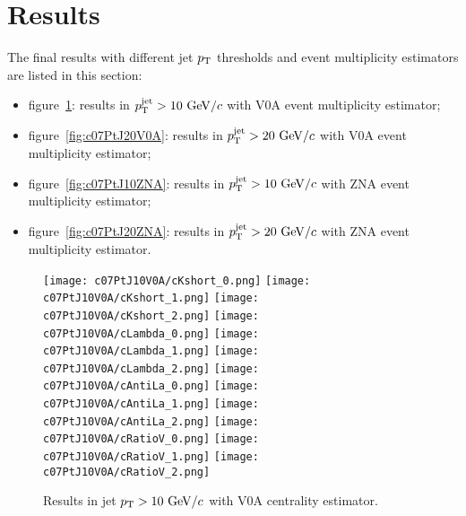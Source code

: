 \section{Results}

The final results with different jet $p_{\rm T}$ thresholds and event
multiplicity estimators are listed in this section:
\begin{itemize}
\item figure~\ref{fig:c07PtJ10V0A}:
      results in $p_{\rm T}^{\rm jet}>10~{\rm GeV}/c$
      with V0A event multiplicity estimator;
\item figure~\ref{fig:c07PtJ20V0A}:
      results in $p_{\rm T}^{\rm jet}>20~{\rm GeV}/c$
      with V0A event multiplicity estimator;
\item figure~\ref{fig:c07PtJ10ZNA}:
      results in $p_{\rm T}^{\rm jet}>10~{\rm GeV}/c$
      with ZNA event multiplicity estimator;
\item figure~\ref{fig:c07PtJ20ZNA}:
      results in $p_{\rm T}^{\rm jet}>20~{\rm GeV}/c$
      with ZNA event multiplicity estimator.
\end{itemize}

\begin{figure}[htb]
\begin{center}
\texttt{[image: c07PtJ10V0A/cKshort\_0.png]}
\texttt{[image: c07PtJ10V0A/cKshort\_1.png]}
\texttt{[image: c07PtJ10V0A/cKshort\_2.png]}
\texttt{[image: c07PtJ10V0A/cLambda\_0.png]}
\texttt{[image: c07PtJ10V0A/cLambda\_1.png]}
\texttt{[image: c07PtJ10V0A/cLambda\_2.png]}
\texttt{[image: c07PtJ10V0A/cAntiLa\_0.png]}
\texttt{[image: c07PtJ10V0A/cAntiLa\_1.png]}
\texttt{[image: c07PtJ10V0A/cAntiLa\_2.png]}
\texttt{[image: c07PtJ10V0A/cRatioV\_0.png]}
\texttt{[image: c07PtJ10V0A/cRatioV\_1.png]}
\texttt{[image: c07PtJ10V0A/cRatioV\_2.png]}
\caption{Results in jet $p_{\rm T}>10~{\rm GeV}/c$ with V0A centrality estimator.}
\label{fig:c07PtJ10V0A}
\end{center}
\end{figure}
 
